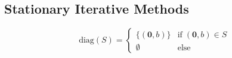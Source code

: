 \subsection{Stationary Iterative Methods} 


\begin{equation}
	\text{diag}(S) = \begin{cases}
		\{(\bm{0}, b) \} & \text{if} \; (\bm 0, b) \in S \\
		\emptyset & \text{else}
	\end{cases}
	\label{eq:stencil-diag}
\end{equation}